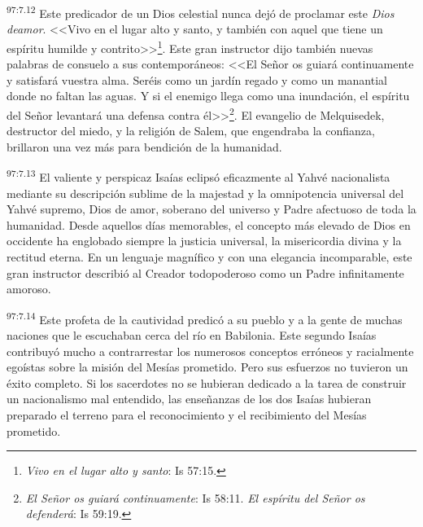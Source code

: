 \par
\textsuperscript{97:7.12} Este predicador de un Dios celestial nunca dejó de proclamar este \textit{Dios deamor}. <<Vivo en el lugar alto y santo, y también con aquel que tiene un espíritu humilde y contrito>>\footnote{\textit{Vivo en el lugar alto y santo}: Is 57:15.}. Este gran instructor dijo también nuevas palabras de consuelo a sus contemporáneos: <<El Señor os guiará continuamente y satisfará vuestra alma. Seréis como un jardín regado y como un manantial donde no faltan las aguas. Y si el enemigo llega como una inundación, el espíritu del Señor levantará una defensa contra él>>\footnote{\textit{El Señor os guiará continuamente}: Is 58:11. \textit{El espíritu del Señor os defenderá}: Is 59:19.}. El evangelio de Melquisedek, destructor del miedo, y la religión de Salem, que engendraba la confianza, brillaron una vez más para bendición de la humanidad.

\par
\textsuperscript{97:7.13} El valiente y perspicaz Isaías eclipsó eficazmente al Yahvé nacionalista mediante su descripción sublime de la majestad y la omnipotencia universal del Yahvé supremo, Dios de amor, soberano del universo y Padre afectuoso de toda la humanidad. Desde aquellos días memorables, el concepto más elevado de Dios en occidente ha englobado siempre la justicia universal, la misericordia divina y la rectitud eterna. En un lenguaje magnífico y con una elegancia incomparable, este gran instructor describió al Creador todopoderoso como un Padre infinitamente amoroso.

\par
\textsuperscript{97:7.14} Este profeta de la cautividad predicó a su pueblo y a la gente de muchas naciones que le escuchaban cerca del río en Babilonia. Este segundo Isaías contribuyó mucho a contrarrestar los numerosos conceptos erróneos y racialmente egoístas sobre la misión del Mesías prometido. Pero sus esfuerzos no tuvieron un éxito completo. Si los sacerdotes no se hubieran dedicado a la tarea de construir un nacionalismo mal entendido, las enseñanzas de los dos Isaías hubieran preparado el terreno para el reconocimiento y el recibimiento del Mesías prometido.

